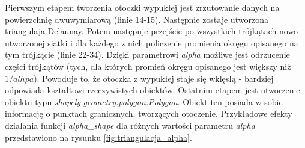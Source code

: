 Pierwszym etapem tworzenia otoczki wypukłej jest zrzutowanie danych na powierzchnię dwuwymiarową (linie 14-15).
Następnie zostaje utworzona triangulaja Delaunay. Potem następuje przejście po wszystkich trójkątach nowo
utworzonej siatki i dla każdego z nich policzenie promienia okręgu opisanego na tym trójkącie (linie 22-34). Dzięki
parametrowi \textit{alpha} możliwe jest odrzucenie części trójkątów (tych, dla których promień okręgu opisanego jest większy niż $1/alhpa$).
Powoduje to, że otoczka z wypukłej staje się wklęsłą - bardziej odpowiada kształtowi rzeczywistych obiektów.
Ostatnim etapem jest utworzenie obiektu typu \textit{shapely.geometry.polygon.Polygon}. Obiekt ten posiada w sobie informację
o punktach granicznych, tworzących otoczenie. Przykładowe efekty działania funkcji \textit{alpha\_shape} dla różnych wartości 
parametru \textit{alpha} przedstawiono na rysunku \ref{fig:triangulacja_alpha}.

